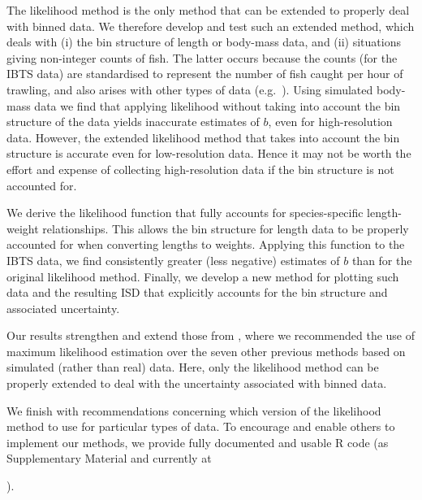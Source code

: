 \documentclass[12pt, letter]{article}
\newcommand{\MEE}{erpbb17}     %
\begin{document}
The likelihood method is the only method that can be extended to properly deal
with binned data. We therefore develop and test such an extended
method, which deals with (i) the bin structure of length or body-mass data, and
(ii) situations giving non-integer counts of fish. The latter occurs because the
counts (for the IBTS data)
are standardised to represent the number of fish caught per hour of
trawling, and also arises with other types of data (e.g.~\citealt{rwnz11}).
Using simulated body-mass data we find that applying likelihood
without taking into account the bin structure of the data yields inaccurate
estimates of $b$, even for high-resolution data. However, the extended
likelihood method that takes into account the bin
structure is accurate even
for low-resolution data. Hence it may not be worth the effort and expense of
collecting high-resolution data if the bin structure is not accounted for.

We derive the likelihood
function that fully accounts for species-specific length-weight
relationships. This allows the bin structure for length data to be properly
accounted for when converting lengths to weights.
Applying this function to the IBTS data, we find consistently greater
(less negative) estimates of $b$ than for the original likelihood method.
Finally, we develop a new method for plotting such data and the resulting
ISD that explicitly accounts for the
bin structure and associated uncertainty.

Our results strengthen and extend those from \citet{\MEE}, where we recommended the use of
maximum likelihood estimation over the seven other previous methods based on
simulated (rather than real) data. Here, only the likelihood method can be
properly extended to deal with the uncertainty associated with binned data.

We finish with recommendations concerning which version of the likelihood method
to use for particular types of data. To encourage and enable others to implement
our methods, we provide fully documented and usable R code (as Supplementary
Material and currently at

).
\end{document}
